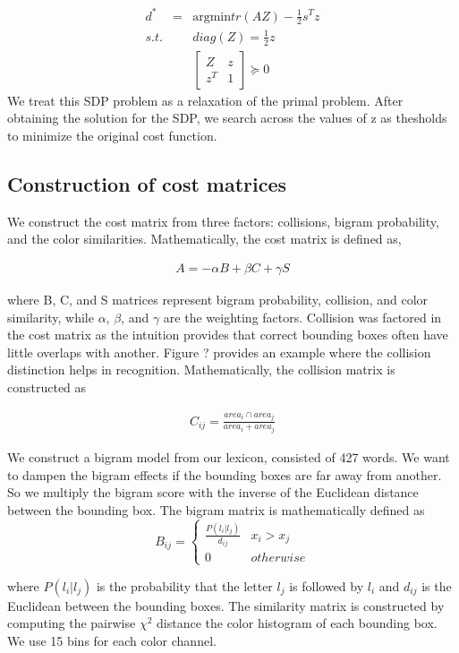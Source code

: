 \documentclass[10pt,twocolumn,letterpaper]{article}
\begin{document}
\begin{eqnarray*}
d^{*} & = & \mbox{argmin} tr(AZ)-\frac{1}{2}s^{T}z\\
s.t. &  & diag(Z)=\frac{1}{2}z\\
 &  & \left[\begin{array}{cc}
Z & z\\
z^{T} & 1
\end{array}\right]\succeq0
\end{eqnarray*}
We treat this SDP problem as a relaxation of the primal problem. After obtaining the solution for the SDP, we search across the values of z as thesholds to minimize the original cost function.
\subsection{Construction of cost matrices}
We construct the cost matrix from three factors: collisions, bigram probability, and the color similarities. Mathematically, the cost matrix is defined as,

\begin{eqnarray*}
A=-\alpha B+\beta C+\gamma S
\end{eqnarray*}

where B, C, and S matrices represent bigram probability, collision, and color similarity, while $\alpha$, $\beta$, and $\gamma$ are the weighting factors.
Collision was factored in the cost matrix as the intuition provides that correct bounding boxes often have little overlaps with another. Figure ? provides an example where the collision distinction helps in recognition. Mathematically, the collision matrix is constructed as 

\begin{eqnarray*}
C_{ij}=\frac{area_{i}\cap area_{j}}{area_{i}+area_{j}}
\end{eqnarray*}

We construct a bigram model from our lexicon, consisted of 427 words. We want to dampen the bigram effects if the bounding boxes are far away from another. So we multiply the bigram score with the inverse of the Euclidean distance between the bounding box. The bigram matrix is mathematically defined as
\[
B_{ij}=\begin{cases}
\frac{P(l_{i}|l_{j})}{d_{ij}} & x_{i}>x_{j}\\
0 & otherwise
\end{cases}
\]

where $P(l_{i}|l_{j})$ is the probability that the letter $l_{j}$ is followed by $l_{i}$ and $d_{ij}$ is the Euclidean between the bounding boxes. The similarity matrix is constructed by computing the pairwise $\chi^2$ distance the color histogram of each bounding box. We use 15 bins for each color channel.
\end{document}
